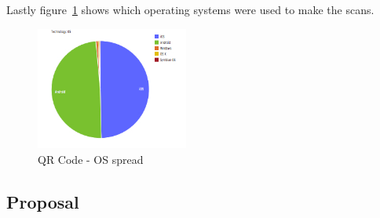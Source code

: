 \documentclass[a4paper,12pt]{article}
\begin{document}
\par
Lastly figure~\ref{QR-OS-access} shows which operating systems were used to make the scans.
\begin{figure}[ht!]
	\centering
	\includegraphics[width=50mm]{./images/OSAccess}
	\caption{QR Code - OS spread}
	\label{QR-OS-access}
\end{figure}





\newpage
\subsection{Proposal}
\end{document}
